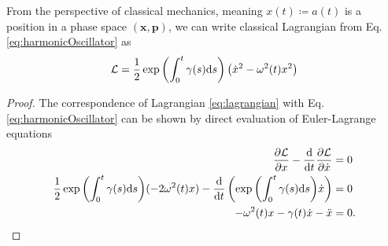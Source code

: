 From the perspective of classical mechanics, meaning $x(t)\coloneqq a(t)$ is a position in a phase space $(\bm x,\bm p)$, we can write classical Lagrangian from Eq. \ref{eq:harmonicOscillator} as
\begin{equation}
    \mathcal L=\frac{1}{2}\exp{\left(\int_0^t\gamma(s)\ensuremath{\mathrm{d}}s\right)}\left(\dot x^2-\omega^2(t)x^2\right)
    \label{eq:lagrangian}
\end{equation}
\begin{proof}
    The correspondence of Lagrangian \ref{eq:lagrangian} with Eq. \ref{eq:harmonicOscillator} can be shown by direct evaluation of Euler-Lagrange equations
    \begin{equation}
        \begin{split}
            \frac{\partial \mathcal L}{\partial x}-\frac{\mathrm{d} }{\mathrm{d} t}\frac{\partial \mathcal L}{\partial \dot x}&=0\\
            \frac{1}{2}\exp{\left(\int_0^t\gamma(s)\ensuremath{\mathrm{d}}s\right)}(-2 \omega^2(t)x)-\frac{\mathrm{d} }{\mathrm{d} t}\left(\exp{\left(\int_0^t\gamma(s)\ensuremath{\mathrm{d}}s\right)}\dot x\right) &=0\\
            -\omega^2(t)x-\gamma(t)\dot x-\ddot x&=0.
        \end{split}
    \end{equation}
\end{proof}










